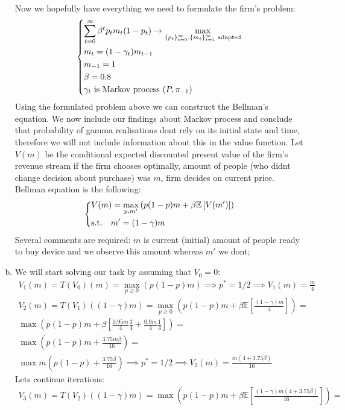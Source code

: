 \documentclass[11pt, oneside]{article}
\newcommand{\E}{\mathbb{E}}
\renewcommand{\b}{\beta}
\newcommand{\g}{\gamma}
\begin{document}
\begin{enumerate}[(a)]
	Now we hopefully have everything we need to formulate the firm's problem:
	\[
	\begin{dcases}
		 \sum_{t=0}^{\infty}\b^{t} p_{t}m_{t}(1-p_{t}) \to \max_{\{p_{t}\}_{t=0}^{\infty}, \{m_{t}\}_{t=1}^{\infty} \text{ adapted}} \\
		 m_{t} = (1-\g_{t})m_{t-1}\\
		 m_{-1} = 1 \\
		 \b = 0.8 \\
		 \g_{t} \text{ is Markov process } (P, \pi_{-1}) 
	\end{dcases}
	\]
	Using the formulated problem above we can construct the Bellman's equation. We now include our findings about Markov process and conclude that probability of gamma realisations dont rely on its initial state and time, therefore we will not include information about this in the value function. Let $ V(m) $ be the conditional expected discounted present value of the firm's revenue stream if the firm chooses optimally, amount of people (who didnt change decision about purchase) was $ m $, firm decides on current price. Bellman equation is the following:
	\[
	\begin{dcases}
			V(m) = \max_{p, m'} \left( p(1-p)m + \b\E\left[ V(m')\right] \right) \\
			\text{s.t.} \quad m' = (1-\g)m
	\end{dcases}
	\]
	Several comments are required: $ m $ is current (initial) amount of people ready to buy device and we observe this amount whereas $ m' $ we dont;
	\item We will start solving our task by assuming that $ V_{0} = 0 $:
	\begin{gather*}
		V_{1}(m) = T(V_{0})(m) = \max_{p \ge 0} \left( p(1-p)m \right) \implies p^{*} = 1/2 \implies V_{1}(m) = \frac{m}{4} \\
		V_{2}(m) = T(V_{1})((1-\g)m) = \max_{p\ge 0} \left( p(1-p)m + \b \E \left[ \frac{(1 - \g)m}{4} \right] \right) = \\
		\max \left( p(1-p)m + \b \left[ \frac{0.95m}{4}\frac{3}{4} + \frac{0.9m}{4}\frac{1}{4} \right] \right) = \\
		\max \left( p(1-p)m +  \frac{3.75m\b}{16} \right) = \\
		\max m\left( p(1-p) +  \frac{3.75\b}{16} \right) \implies p^{*} = 1/2 \implies V_{2}(m)= \frac{m(4 + 3.75 \b)}{16}
	\end{gather*}
Lets continue iterations:
\begin{gather*}
	V_{3}(m) = T(V_{2})((1-\g)m) = \max \left( p(1-p)m + \b \E\left[ \frac{(1-\g)m(4 + 3.75 \b)}{16} \right] \right) = \\

\end{gather*}
\end{enumerate}
\end{document}
